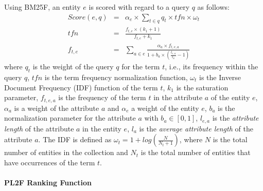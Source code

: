 Using BM25F, an entity $e$ is scored with regard to a query $q$ as follows:
\begin{eqnarray}
  Score(e,q) & = & \alpha_e\times\sum_{t\in q}{q_t\times tfn \times \omega_t}\\
  \label{eq:tfidf-score}
  tfn & = & \frac{f_{t,e}\times(k_1+1)}{f_{t,e}+k_1} \\
  \label{eq:bm25f_2}
  f_{t,e} & = &
  \sum_{a\in e}{\frac{\alpha_a\times f_{t,e,a}}{1+b_a\times\left(\frac{l_{e,a}}{l_a}-1\right)}}
  \label{eq:bm25f_1}
\end{eqnarray}
where $q_t$ is the weight of the query $q$ for the term $t$, i.e., its frequency within the query $q$, $tfn$ is the term frequency normalization function, $\omega_t$ is the Inverse Document Frequency (IDF) function of the term $t$, $k_1$ is the saturation parameter, $f_{t,e,a}$ is the frequency of the term $t$ in the attribute $a$ of the entity $e$, $\alpha_a$ is a weight of the attribute $a$ and $\alpha_e$ a weight of the entity $e$, $b_a$ is the normalization parameter for the attribute $a$ with $b_a \in \left[0,1\right]$, $l_{e,a}$ is the \emph{attribute length} of the attribute $a$ in the entity $e$, $l_a$ is the \emph{average attribute length} of the attribute $a$. The IDF is defined as
$
\omega_t=1+log\left(\frac{N}{N_t+1}\right)
$,
where $N$ is the total number of entities in the collection and $N_t$ is the total number of entities that have occurrences of the term $t$.

\paragraph{PL2F Ranking Function}

